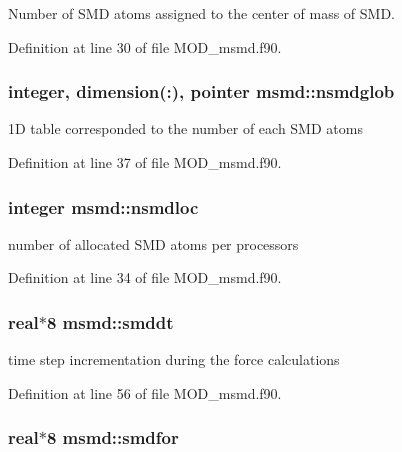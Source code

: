 Number of S\-M\-D atoms assigned to the center of mass of S\-M\-D. 



Definition at line 30 of file M\-O\-D\-\_\-msmd.\-f90.

\hypertarget{classmsmd_a904292a72123ef4d6f6bc89188e84553}{
\subsubsection[{nsmdglob}]{\setlength{\rightskip}{0pt plus 5cm}integer, dimension(\-:), pointer msmd\-::nsmdglob}}\label{classmsmd_a904292a72123ef4d6f6bc89188e84553}


1\-D table corresponded to the number of each S\-M\-D atoms 



Definition at line 37 of file M\-O\-D\-\_\-msmd.\-f90.

\hypertarget{classmsmd_a3d82fa00829c2cca7bfff321c83f579b}{
\subsubsection[{nsmdloc}]{\setlength{\rightskip}{0pt plus 5cm}integer msmd\-::nsmdloc}}\label{classmsmd_a3d82fa00829c2cca7bfff321c83f579b}


number of allocated S\-M\-D atoms per processors 



Definition at line 34 of file M\-O\-D\-\_\-msmd.\-f90.

\hypertarget{classmsmd_a36703a894904f14db8c7d5c321a5818f}{
\subsubsection[{smddt}]{\setlength{\rightskip}{0pt plus 5cm}real$\ast$8 msmd\-::smddt}}\label{classmsmd_a36703a894904f14db8c7d5c321a5818f}


time step incrementation during the force calculations 



Definition at line 56 of file M\-O\-D\-\_\-msmd.\-f90.

\hypertarget{classmsmd_a0cfec7a2408289c6345e02f9be8ed9ef}{
\subsubsection[{smdfor}]{\setlength{\rightskip}{0pt plus 5cm}real$\ast$8 msmd\-::smdfor}}\label{classmsmd_a0cfec7a2408289c6345e02f9be8ed9ef}


